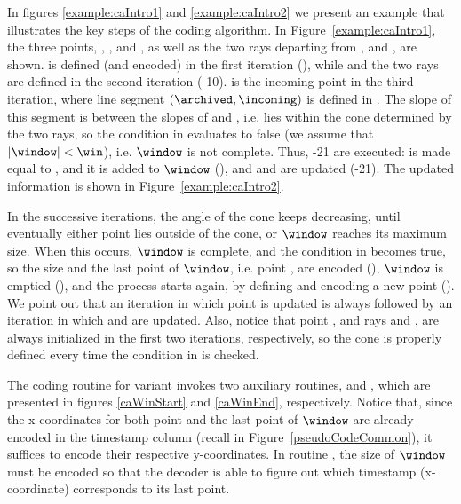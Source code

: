 In figures \ref{example:caIntro1} and \ref{example:caIntro2} we present an example that illustrates the key steps of the coding algorithm. In Figure~\ref{example:caIntro1}, the three points, \incoming, \archived, and \snapshot, as well as the two rays departing from \archived, \smin and \smax, are shown. \archived is defined (and encoded) in the first iteration (), while \snapshot and the two rays are defined in the second iteration (-10). \incoming is the incoming point in the third iteration, where line segment $(\archived, \incoming)$ is defined in . The slope of this segment is between the slopes of \smin and \smax, i.e. \incoming lies within the cone determined by the two rays, so the condition in  evaluates to false (we assume that $|\window|<\win$), i.e. $\window$ is not complete. Thus, -21 are executed: \snapshot is made equal to \incoming, and it is added to $\window$ (), and \smin and \smax are updated (-21). The updated information is shown in Figure~\ref{example:caIntro2}. 


\vspace{+5pt}
\exampleCA


\vspace{+5pt}
In the successive iterations, the angle of the cone keeps decreasing, until eventually either point \incoming lies outside of the cone, or $\window$ reaches its maximum size. When this occurs, $\window$ is complete, and the condition in  becomes true, so the size and the last point of $\window$, i.e. point \snapshot, are encoded (), $\window$ is emptied (), and the process starts again, by defining and encoding a new point \archived (). We point out that an iteration in which point \archived is updated is always followed by an iteration in which \smin and \smax are updated. Also, notice that point \archived, and rays \smin and \smax, are always initialized in the first two iterations, respectively, so the cone is properly defined every time the condition in  is checked.


\vspace{+5pt}
The coding routine for variant \maskalgo invokes two auxiliary routines, \CAWinStart and \CAWinEnd, which are presented in figures \ref{caWinStart} and \ref{caWinEnd}, respectively. Notice that, since the x-coordinates for both point \archived and the last point of $\window$ are already encoded in the timestamp column (recall  in Figure~\ref{pseudoCodeCommon}), it suffices to encode their respective y-coordinates. In routine \CAWinEnd, the size of $\window$ must be encoded so that the decoder is able to figure out which timestamp (x-coordinate) corresponds to its last point.



